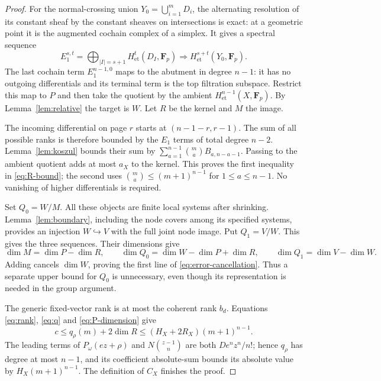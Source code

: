 \documentclass[11pt]{article}
\theoremstyle{remark}\newtheorem{remark}[theorem]{Remark}
\newcommand{\FF}{\mathbf F}
\newcommand{\et}{\mathrm{et}}
\begin{document}
\begin{proof}
For the normal-crossing union $Y_0=\bigcup_{i=1}^mD_i$, the alternating resolution of its constant sheaf by the constant sheaves on intersections is exact: at a geometric point it is the augmented cochain complex of a simplex. It gives a spectral sequence
\begin{equation}\label{eq:cech}
 E_1^{s,t}=\bigoplus_{|I|=s+1}H^t_{\et}(D_I,\FF_p)
                  \Longrightarrow H^{s+t}_{\et}(Y_0,\FF_p).
\end{equation}
The last cochain term $E_1^{n-1,0}$ maps to the abutment in degree $n-1$: it has no outgoing differentials and its terminal term is the top filtration subspace. Restrict this map to $P$ and then take the quotient by the ambient $H^{n-1}_{\et}(X,\FF_p)$. By Lemma~\ref{lem:relative} the target is $W$. Let $R$ be the kernel and $M$ the image.

The incoming differential on page $r$ starts at $(n-1-r,r-1)$. The sum of all possible ranks is therefore bounded by the $E_1$ terms of total degree $n-2$. Lemma~\ref{lem:koszul} bounds their sum by
$\sum_{a=1}^{n-1}\binom ma B_{a,n-a-1}$. Passing to the ambient quotient adds at most $a_X$ to the kernel. This proves the first inequality in \eqref{eq:R-bound}; the second uses $\binom ma\le(m+1)^{n-1}$ for $1\le a\le n-1$. No vanishing of higher differentials is required.

Set $Q_0=W/M$. All these objects are finite local systems after shrinking. Lemma~\ref{lem:boundary}, including the node covers among its specified systems, provides an injection $W\hookrightarrow V$ with the full joint node image. Put $Q_1=V/W$. This gives the three sequences. Their dimensions give
\[
 \dim M=\dim P-\dim R,\qquad
 \dim Q_0=\dim W-\dim P+\dim R,
 \qquad \dim Q_1=\dim V-\dim W.
\]
Adding cancels $\dim W$, proving the first line of \eqref{eq:error-cancellation}. Thus a separate upper bound for $Q_0$ is unnecessary, even though its representation is needed in the group argument.

The generic fixed-vector rank is at most the coherent rank $b_d$. Equations \eqref{eq:rank}, \eqref{eq:q} and \eqref{eq:P-dimension} give
\[
        c\le q_\rho(m)+2\dim R
          \le(H_X+2R_X)(m+1)^{n-1}.
\]
The leading terms of $P_\omega(ez+\rho)$ and $N\binom{z-1}{n}$ are both $De^nz^n/n!$; hence $q_\rho$ has degree at most $n-1$, and its coefficient absolute-sum bounds its absolute value by $H_X(m+1)^{n-1}$. The definition of $C_X$ finishes the proof.
\end{proof}
\end{document}

